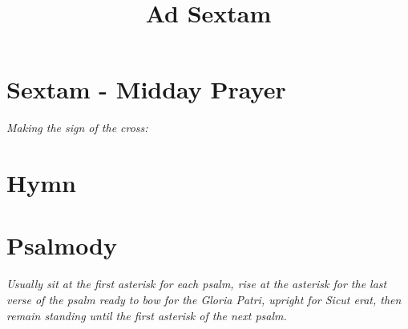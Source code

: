 \documentclass[a4paper,12pt,twoside,openany]{memoir}
\title{Ad Sextam}
\renewcommand\Vbar{\makebox[1em][l]{\versicles v}}
\renewcommand\Rbar{\makebox[1em][l]{\versicles r}}
\newcommand\rubrics[1]{\textit{#1}}
\begin{document}
\nouppercaseheads
\pagestyle{myheadings}



\setcounter{secnumdepth}{0}






\section{Sextam - Midday Prayer}

\rubrics{Making the sign of the cross:}


\bigskip





\section{Hymn}





\section{Psalmody}

\rubrics{Usually sit at the first asterisk for each psalm, rise at the asterisk for the last verse of the psalm ready to bow for the \emph{Gloria Patri}, upright for \emph{Sicut erat}, then remain standing until the first asterisk of the next psalm.}
\end{document}
